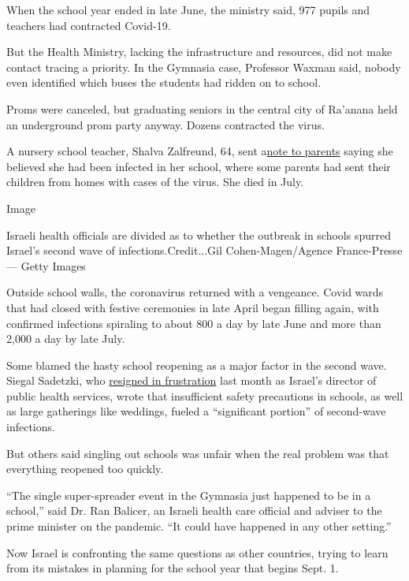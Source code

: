 When the school year ended in late June, the ministry said, 977 pupils
and teachers had contracted Covid-19.

But the Health Ministry, lacking the infrastructure and resources, did
not make contact tracing a priority. In the Gymnasia case, Professor
Waxman said, nobody even identified which buses the students had ridden
on to school.

Proms were canceled, but graduating seniors in the central city of
Ra'anana held an underground prom party anyway. Dozens contracted the
virus.

A nursery school teacher, Shalva Zalfreund, 64, sent
a\href{https://www.facebookcorewwwi.onion/photo.php?fbid=2694147267485782\&set=a.1636227159944470\&type=3\&theater}{note
to parents} saying she believed she had been infected in her school,
where some parents had sent their children from homes with cases of the
virus. She died in July.

Image

Israeli health officials are divided as to whether the outbreak in
schools spurred Israel's second wave of infections.Credit...Gil
Cohen-Magen/Agence France-Presse --- Getty Images

Outside school walls, the coronavirus returned with a vengeance. Covid
wards that had closed with festive ceremonies in late April began
filling again, with confirmed infections spiraling to about 800 a day by
late June and more than 2,000 a day by late July.

Some blamed the hasty school reopening as a major factor in the second
wave. Siegal Sadetzki, who
\href{https://www.timesofisrael.com/top-health-ministry-official-quits-warns-israel-heading-down-dangerous-path/}{resigned
in frustration} last month as Israel's director of public health
services, wrote that insufficient safety precautions in schools, as well
as large gatherings like weddings, fueled a ``significant portion'' of
second-wave infections.

But others said singling out schools was unfair when the real problem
was that everything reopened too quickly.

``The single super-spreader event in the Gymnasia just happened to be in
a school,'' said Dr. Ran Balicer, an Israeli health care official and
adviser to the prime minister on the pandemic. ``It could have happened
in any other setting.''

Now Israel is confronting the same questions as other countries, trying
to learn from its mistakes in planning for the school year that begins
Sept. 1.

